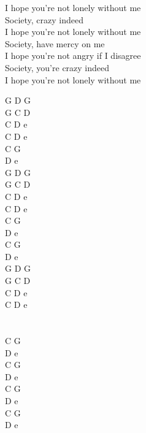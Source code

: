 \documentclass[a5paper, 10pt]{book}
\begin{document}
\begin{minipage}[t]{0.9\textwidth}
  \hspace*{5mm}I hope you're not lonely without me\\
  \hspace*{5mm}Society, crazy indeed\\
  \hspace*{5mm}I hope you're not lonely without me\\
  \hspace*{5mm}Society, have mercy on me\\
  \hspace*{5mm}I hope you're not angry if I disagree\\
  \hspace*{5mm}Society, you're crazy indeed\\
  \hspace*{5mm}I hope you're not lonely without me\\
\end{minipage}
\begin{minipage}[t]{0.1\textwidth}
  G D G\\
  G C D\\
  C D e\\
  C D e\\

  C G\\
  D e\\

  G D G\\
  G C D\\
  C D e\\
  C D e\\

  C G\\
  D e\\
  C G\\
  D e\\

  G D G\\
  G C D\\
  C D e\\
  C D e\\
  \\
  \\
  C G\\
  D e\\
  C G\\
  D e\\
  C G\\
  D e\\
  C G\\
  D e\\

\end{minipage}
\end{document}
